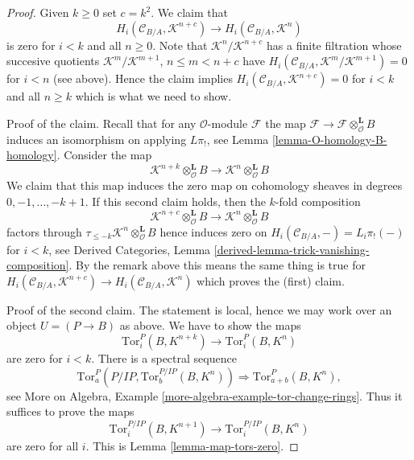 \begin{proof}
\medskip\noindent
Given $k \geq 0$ set $c = k^2$. We claim that
$$
H_i(\mathcal{C}_{B/A}, \mathcal{K}^{n + c}) \to
H_i(\mathcal{C}_{B/A}, \mathcal{K}^n)
$$
is zero for $i < k$ and all $n \geq 0$. Note that
$\mathcal{K}^n/\mathcal{K}^{n + c}$ has a finite filtration whose succesive
quotients $\mathcal{K}^m/\mathcal{K}^{m + 1}$, $n \leq m < n + c$
have $H_i(\mathcal{C}_{B/A}, \mathcal{K}^m/\mathcal{K}^{m + 1}) = 0$
for $i < n$ (see above). Hence the claim implies
$H_i(\mathcal{C}_{B/A}, \mathcal{K}^{n + c}) = 0$ for $i < k$ and all
$n \geq k$ which is what we need to show.

\medskip\noindent
Proof of the claim. Recall that for any $\mathcal{O}$-module $\mathcal{F}$
the map $\mathcal{F} \to \mathcal{F} \otimes_\mathcal{O}^\mathbf{L} B$
induces an isomorphism on applying $L\pi_!$, see
Lemma \ref{lemma-O-homology-B-homology}.
Consider the map
$$
\mathcal{K}^{n + k} \otimes_\mathcal{O}^\mathbf{L} B
\longrightarrow
\mathcal{K}^n \otimes_\mathcal{O}^\mathbf{L} B
$$
We claim that this map induces the zero map on cohomology sheaves
in degrees $0, -1, \ldots, - k + 1$. If this second claim holds, then
the $k$-fold composition
$$
\mathcal{K}^{n + c} \otimes_\mathcal{O}^\mathbf{L} B
\longrightarrow
\mathcal{K}^n \otimes_\mathcal{O}^\mathbf{L} B
$$
factors through $\tau_{\leq -k}\mathcal{K}^n \otimes_\mathcal{O}^\mathbf{L} B$
hence induces zero on $H_i(\mathcal{C}_{B/A}, -) = L_i\pi_!( - )$
for $i < k$, see
Derived Categories, Lemma \ref{derived-lemma-trick-vanishing-composition}.
By the remark above this means the same thing is true for
$H_i(\mathcal{C}_{B/A}, \mathcal{K}^{n + c}) \to
H_i(\mathcal{C}_{B/A}, \mathcal{K}^n)$
which proves the (first) claim.

\medskip\noindent
Proof of the second claim. The statement is local, hence we may work
over an object $U = (P \to B)$ as above. We have to show
the maps
$$
\text{Tor}_i^P(B, K^{n + k}) \to \text{Tor}_i^P(B, K^n)
$$
are zero for $i < k$. There is a spectral sequence
$$
\text{Tor}_a^P(P/IP, \text{Tor}_b^{P/IP}(B, K^n))
\Rightarrow
\text{Tor}_{a + b}^P(B, K^n),
$$
see More on Algebra, Example \ref{more-algebra-example-tor-change-rings}.
Thus it suffices to prove the maps
$$
\text{Tor}_i^{P/IP}(B, K^{n + 1}) \to \text{Tor}_i^{P/IP}(B, K^n)
$$
are zero for all $i$. This is Lemma \ref{lemma-map-tors-zero}.
\end{proof}

